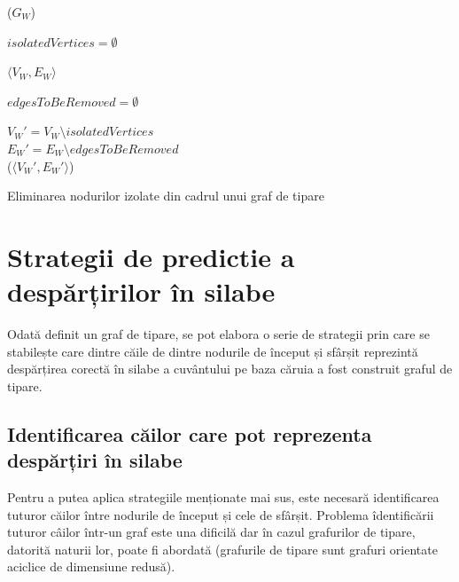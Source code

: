 \begin{algorithm}[h!]
\SetAlgoLined
{}

\ppg($G_{W}$) \\

$isolatedVertices = \emptyset$ \\

 {
	\KwRet $\langle V_W, E_W \rangle$
}


$edgesToBeRemoved = \emptyset$ \\

$V_W' = V_W \setminus isolatedVertices$\\
$E_W' = E_W \setminus edgesToBeRemoved$\\

\KwRet \ppg($\langle V_W', E_W'  \rangle$) \\
\vspace{.1cm}

\caption{Eliminarea nodurilor izolate din cadrul unui graf de tipare}
\label{algo:prunning}
\end{algorithm}

\section{Strategii de predictie a despărțirilor în silabe}

Odată definit un graf de tipare, se pot elabora o serie de strategii prin care se stabilește care dintre căile de dintre nodurile de început și sfârșit reprezintă despărțirea corectă în silabe a cuvântului pe baza căruia a fost construit graful de tipare. 
\subsection{Identificarea căilor care pot reprezenta despărțiri în silabe}

Pentru a putea aplica strategiile menționate mai sus, este necesară identificarea tuturor căilor între nodurile de început și cele de sfârșit. Problema îdentificării tuturor câilor într-un graf este una dificilă dar în cazul grafurilor de tipare, datorită naturii lor, poate fi abordată (grafurile de tipare sunt grafuri orientate aciclice de dimensiune redusă). 

